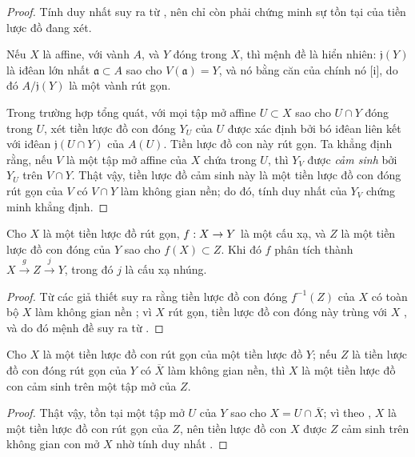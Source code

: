 \documentclass[oneside]{amsart}
\makeatletter
\newcommand{\ega@arrow}[2]{\mathchoice{#1}{#2}{#2}{#2}}
\renewcommand{\to}{\ega@arrow{\longrightarrow}{\rightarrow}}
\newcommand{\oldpage}[2][]{{\marginnote{\normalfont\textbf{#1}~|~#2}}\ignorespaces}
\let\EGAOriginalLabel\label
\renewcommand{\label}[1]{\phantomsection\EGAOriginalLabel{#1}}
\makeatother
\begin{document}
\begin{proof}
Tính duy nhất suy ra từ , nên chỉ còn phải chứng minh sự tồn tại của tiền lược đồ đang xét.

Nếu $X$ là affine, với vành $A$, và $Y$ đóng trong $X$, thì mệnh đề là hiển nhiên:
$\mathfrak{j}(Y)$ là iđêan lớn nhất $\mathfrak{a}\subset A$ sao cho $V(\mathfrak{a})=Y$, và nó bằng căn của chính nó [i], do đó $A/\mathfrak{j}(Y)$ là một vành rút gọn.

Trong trường hợp tổng quát, với mọi tập mở affine $U\subset X$ sao cho $U\cap Y$ đóng trong $U$, xét tiền lược đồ con đóng $Y_U$ của $U$ được xác định bởi bó iđêan liên kết với iđêan $\mathfrak{j}(U\cap Y)$ của $A(U)$.
Tiền lược đồ con này rút gọn.
Ta khẳng định rằng, nếu $V$ là một tập mở affine của $X$ chứa trong $U$, thì $Y_V$ được \emph{cảm sinh} bởi $Y_U$ trên $V\cap Y$.
Thật vậy, tiền lược đồ cảm sinh này là một tiền lược đồ con đóng rút gọn của $V$ có $V\cap Y$ làm không gian nền;
do đó, tính duy nhất của $Y_V$ chứng minh khẳng định.
\end{proof}

\begin{proposition}[5.2.2]
\label{I.5.2.2}
Cho $X$ là một tiền lược đồ rút gọn, $f:X \to Y$ là một cấu xạ, và $Z$ là một tiền lược đồ con đóng của $Y$ sao cho $f(X) \subset Z$.
Khi đó $f$ phân tích thành $X \xrightarrow{g} Z \xrightarrow{j} Y$, trong đó $j$ là cấu xạ nhúng.
\end{proposition}

\begin{proof}
Từ các giả thiết suy ra rằng tiền lược đồ con đóng $f^{-1}(Z)$ của $X$ có toàn bộ $X$ làm không gian nền ;
vì $X$ rút gọn, tiền lược đồ con đóng này trùng với $X$ , và do đó mệnh đề suy ra từ .
\end{proof}

\begin{corollary}[5.2.3]
\label{I.5.2.3}
Cho $X$ là một tiền lược đồ con rút gọn của một tiền lược đồ $Y$; nếu $Z$ là tiền lược đồ con đóng rút gọn của $Y$ có $\overline{X}$ làm không gian nền, thì $X$ là một tiền lược đồ con cảm sinh trên một tập mở của $Z$.
\end{corollary}

\begin{proof}
\oldpage[I]{132}
Thật vậy, tồn tại một tập mở $U$ của $Y$ sao cho $X=U\cap\overline{X}$;
vì theo , $X$ là một tiền lược đồ con rút gọn của $Z$, nên tiền lược đồ con $X$ được $Z$ cảm sinh trên không gian con mở $X$ nhờ tính duy nhất .
\end{proof}
\end{document}
